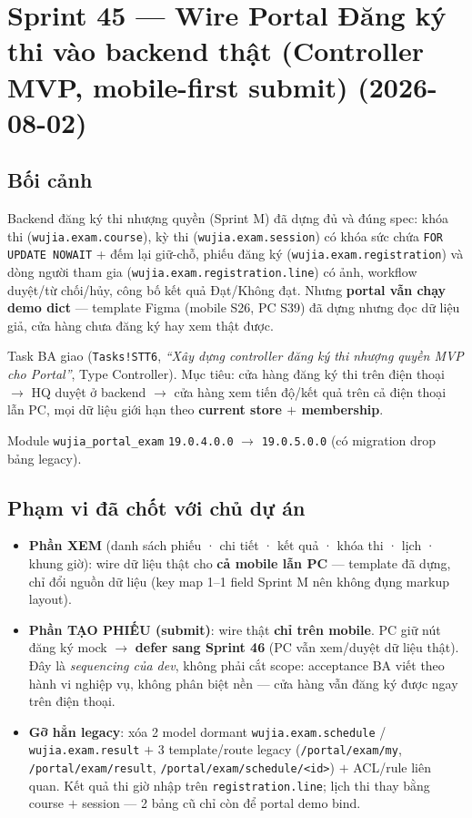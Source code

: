 \chapter{Sprint 45 --- Wire Portal Đăng ký thi vào backend thật (Controller MVP, mobile-first submit) (2026-08-02)}

\section{Bối cảnh}

Backend đăng ký thi nhượng quyền (Sprint M) đã dựng đủ và đúng spec: khóa thi
(\texttt{wujia.exam.course}), kỳ thi (\texttt{wujia.exam.session}) có khóa sức chứa
\texttt{FOR UPDATE NOWAIT} + đếm lại giữ-chỗ, phiếu đăng ký
(\texttt{wujia.exam.registration}) và dòng người tham gia
(\texttt{wujia.exam.registration.line}) có ảnh, workflow duyệt/từ chối/hủy, công bố kết
quả Đạt/Không đạt. Nhưng \textbf{portal vẫn chạy demo dict} --- template Figma (mobile
S26, PC S39) đã dựng nhưng đọc dữ liệu giả, cửa hàng chưa đăng ký hay xem thật được.

Task BA giao (\texttt{Tasks!STT6}, \emph{``Xây dựng controller đăng ký thi nhượng quyền
MVP cho Portal''}, Type Controller). Mục tiêu: cửa hàng đăng ký thi trên điện thoại
$\rightarrow$ HQ duyệt ở backend $\rightarrow$ cửa hàng xem tiến độ/kết quả trên cả điện
thoại lẫn PC, mọi dữ liệu giới hạn theo \textbf{current store $+$ membership}.

Module \texttt{wujia\_portal\_exam} \texttt{19.0.4.0.0} $\rightarrow$ \texttt{19.0.5.0.0}
(có migration drop bảng legacy).

\section{Phạm vi đã chốt với chủ dự án}

\begin{itemize}
  \item \textbf{Phần XEM} (danh sách phiếu · chi tiết · kết quả · khóa thi · lịch · khung
    giờ): wire dữ liệu thật cho \textbf{cả mobile lẫn PC} --- template đã dựng, chỉ đổi
    nguồn dữ liệu (key map 1--1 field Sprint M nên không đụng markup layout).
  \item \textbf{Phần TẠO PHIẾU (submit)}: wire thật \textbf{chỉ trên mobile}.
    PC giữ nút đăng ký mock $\rightarrow$ \textbf{defer sang Sprint 46} (PC vẫn xem/duyệt
    dữ liệu thật). Đây là \emph{sequencing của dev}, không phải cắt scope: acceptance BA
    viết theo hành vi nghiệp vụ, không phân biệt nền --- cửa hàng vẫn đăng ký được ngay
    trên điện thoại.
  \item \textbf{Gỡ hẳn legacy}: xóa 2 model dormant \texttt{wujia.exam.schedule} /
    \texttt{wujia.exam.result} $+$ 3 template/route legacy (\texttt{/portal/exam/my},
    \texttt{/portal/exam/result}, \texttt{/portal/exam/schedule/<id>}) $+$ ACL/rule liên
    quan. Kết quả thi giờ nhập trên \texttt{registration.line}; lịch thi thay bằng course
    $+$ session --- 2 bảng cũ chỉ còn để portal demo bind.
\end{itemize}

